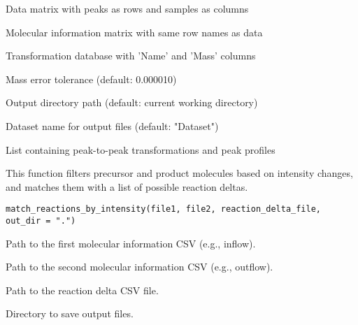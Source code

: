 \documentclass[a4paper]{book}
\begin{document}
\begin{Arguments}
\begin{ldescription}
\item[\code{data}] Data matrix with peaks as rows and samples as columns

\item[\code{mol}] Molecular information matrix with same row names as data

\item[\code{trans\_db}] Transformation database with 'Name' and 'Mass' columns

\item[\code{error\_term}] Mass error tolerance (default: 0.000010)

\item[\code{output\_dir}] Output directory path (default: current working directory)

\item[\code{sample\_name}] Dataset name for output files (default: "Dataset")
\end{ldescription}
\end{Arguments}
%
\begin{Value}
List containing peak-to-peak transformations and peak profiles
\end{Value}
%
\begin{Description}
This function filters precursor and product molecules based on intensity changes,
and matches them with a list of possible reaction deltas.
\end{Description}
%
\begin{Usage}
\begin{verbatim}
match_reactions_by_intensity(file1, file2, reaction_delta_file, out_dir = ".")
\end{verbatim}
\end{Usage}
%
\begin{Arguments}
\begin{ldescription}
\item[\code{file1}] Path to the first molecular information CSV (e.g., inflow).

\item[\code{file2}] Path to the second molecular information CSV (e.g., outflow).

\item[\code{reaction\_delta\_file}] Path to the reaction delta CSV file.

\item[\code{out\_dir}] Directory to save output files.
\end{ldescription}
\end{Arguments}
\end{document}
